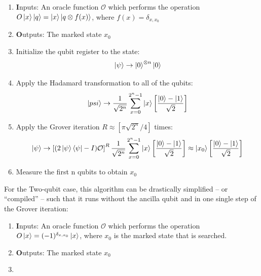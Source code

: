 \begin{enumerate}
  \item {\textbf Inputs:} An oracle function $\mathcal{O}$ which performs the operation $O\left| x \right>\left| q \right> = \left| x \right>\left| q\otimes f(x) \right>$, where $f(x) = \delta_{x,x_0}$
  \item {\textbf Outputs:} The marked state $x_0$
	\item Initialize the qubit register to the state: 
	$$\left| \psi \right> \to \left| 0 \right>^{\otimes n}\left| 0 \right>$$
	\item Apply the Hadamard transformation to all of the qubits: 
	$$\left| psi \right>\to \frac{1}{\sqrt{2^n}}\sum\limits_{x=0}^{2^n-1} \left| x \right> \left[ \frac{\left| 0 \right>-\left| 1 \right>}{\sqrt{2}} \right]$$
	\item Apply the Grover iteration $R \approx [\pi \sqrt{2^n}/4]$ times:
	$$ \left| \psi \right> \to \left[(2 \left| \psi \right>\left< \psi \right|-I)\mathcal{O}\right]^R \frac{1}{\sqrt{2^n}} \sum\limits_{x=0}^{2^n-1}\left| x \right> \left[ \frac{\left| 0 \right>-\left| 1 \right>}{\sqrt{2}} \right] \approx \left| x_0 \right>\left[\frac{\left| 0 \right>-\left| 1 \right>}{\sqrt{2}}\right] $$
	\item Measure the first n qubits to obtain $x_0$
\end{enumerate}

For the Two-qubit case, this algorithm can be drastically simplified -- or ``compiled'' -- such that it runs without the ancilla qubit and in one single step of the Grover iteration:

\begin{enumerate}
  \item {\textbf Inputs:} An oracle function $\mathcal{O}$ which performs the operation $O\left| x \right> =(-1)^{\delta_{x,x_0}}\left| x \right>$, where $x_0$ is the marked state that is searched.
  \item {\textbf Outputs:} The marked state $x_0$
	\item 
\end{enumerate}


